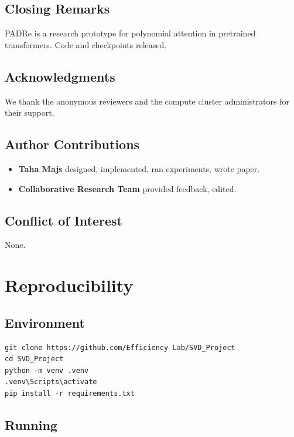 \subsection{Closing Remarks}

PADRe is a research prototype for polynomial attention in pretrained 
transformers. Code and checkpoints released.

\subsection{Acknowledgments}

We thank the anonymous reviewers and the compute cluster administrators for their support.

\subsection{Author Contributions}

\begin{itemize}
\item \textbf{Taha Majs} designed, implemented, ran experiments, wrote paper.
\item \textbf{Collaborative Research Team} provided feedback, edited.

\end{itemize}
\subsection{Conflict of Interest}

None.



\section{Reproducibility}

\subsection{Environment}

\begin{lstlisting}
git clone https://github.com/Efficiency Lab/SVD_Project
cd SVD_Project
python -m venv .venv
.venv\Scripts\activate
pip install -r requirements.txt
\end{lstlisting}

\subsection{Running}

